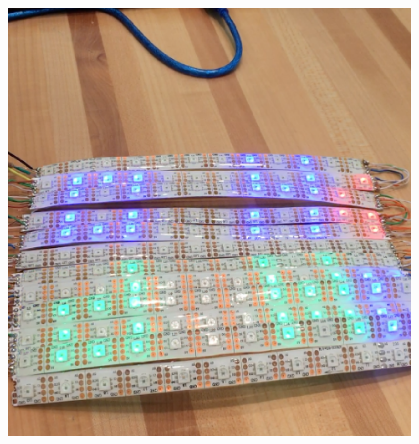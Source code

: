\documentclass[onecolumn, draftclsnofoot,10pt, compsoc]{IEEEtran}
\begin{document}
\includegraphics[width=0.8\textwidth, natwidth=529,natheight=532]{./exPics/light.eps}
\end{document}
